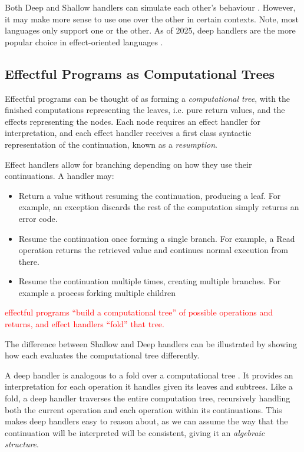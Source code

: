 \documentclass[logo,bsc,singlespacing,parskip]{infthesis}
\begin{document}
Both Deep and Shallow handlers can simulate each other's behaviour \cite{deepAsShallow}. However, it may make more sense to use one over the other in certain contexts. Note, most languages only support one or the other. As of 2025, deep handlers are the more popular choice in effect-oriented languages \cite{}.

\subsection{Effectful Programs as Computational Trees}
Effectful programs can be thought of as forming a \textit{computational tree}, with the finished computations representing the leaves, i.e. pure return values, and the effects representing the nodes. Each node requires an effect handler for interpretation, and each effect handler receives a first class syntactic representation of the continuation, known as a \textit{resumption}. 

Effect handlers allow for branching depending on how they use their continuations. A handler may: 
\begin{itemize}
    \item Return a value without resuming the continuation, producing a leaf. For example, an exception discards the rest of the computation simply returns an error code.
    \item Resume the continuation once forming a single branch. For example, a Read operation returns the retrieved value and continues normal execution from there. 
    \item Resume the continuation multiple times, creating multiple branches. For example a process forking multiple children
\end{itemize}

\textcolor{red}{effectful programs “build a computational tree” of possible operations and returns, and effect handlers “fold” that tree.}


The difference between Shallow and Deep handlers can be illustrated by showing how each evaluates the computational tree differently.

A deep handler is analogous to a fold over a computational tree \cite{hillerstrom_foundations_nodate}. It provides an interpretation for each operation it handles given its leaves and subtrees. Like a fold, a deep handler traverses the entire computation tree, recursively handling both the current operation and each operation within its continuations. This makes deep handlers easy to reason about, as we can assume the way that the continuation will be interpreted will be consistent, giving it an \textit{algebraic structure}.
\end{document}
